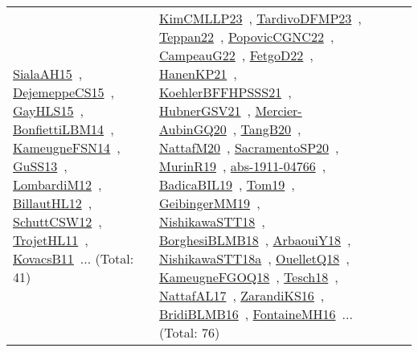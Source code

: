 {\begin{longtable}{lp{3cm}>{\raggedright\arraybackslash}p{6cm}>{\raggedright\arraybackslash}p{6cm}>{\raggedright\arraybackslash}p{8cm}}
\href{papers/SialaAH15.pdf}{SialaAH15}~\cite{SialaAH15}, \href{papers/DejemeppeCS15.pdf}{DejemeppeCS15}~\cite{DejemeppeCS15}, \href{papers/GayHLS15.pdf}{GayHLS15}~\cite{GayHLS15}, \href{articles/BonfiettiLBM14.pdf}{BonfiettiLBM14}~\cite{BonfiettiLBM14}, \href{articles/KameugneFSN14.pdf}{KameugneFSN14}~\cite{KameugneFSN14}, \href{papers/GuSS13.pdf}{GuSS13}~\cite{GuSS13}, \href{articles/LombardiM12.pdf}{LombardiM12}~\cite{LombardiM12}, \href{papers/BillautHL12.pdf}{BillautHL12}~\cite{BillautHL12}, \href{papers/SchuttCSW12.pdf}{SchuttCSW12}~\cite{SchuttCSW12}, \href{articles/TrojetHL11.pdf}{TrojetHL11}~\cite{TrojetHL11}, \href{articles/KovacsB11.pdf}{KovacsB11}~\cite{KovacsB11}... (Total: 41) & \href{papers/KimCMLLP23.pdf}{KimCMLLP23}~\cite{KimCMLLP23}, \href{papers/TardivoDFMP23.pdf}{TardivoDFMP23}~\cite{TardivoDFMP23}, \href{papers/Teppan22.pdf}{Teppan22}~\cite{Teppan22}, \href{papers/PopovicCGNC22.pdf}{PopovicCGNC22}~\cite{PopovicCGNC22}, \href{articles/CampeauG22.pdf}{CampeauG22}~\cite{CampeauG22}, \href{articles/FetgoD22.pdf}{FetgoD22}~\cite{FetgoD22}, \href{papers/HanenKP21.pdf}{HanenKP21}~\cite{HanenKP21}, \href{articles/KoehlerBFFHPSSS21.pdf}{KoehlerBFFHPSSS21}~\cite{KoehlerBFFHPSSS21}, \href{articles/HubnerGSV21.pdf}{HubnerGSV21}~\cite{HubnerGSV21}, \href{papers/Mercier-AubinGQ20.pdf}{Mercier-AubinGQ20}~\cite{Mercier-AubinGQ20}, \href{papers/TangB20.pdf}{TangB20}~\cite{TangB20}, \href{papers/NattafM20.pdf}{NattafM20}~\cite{NattafM20}, \href{articles/SacramentoSP20.pdf}{SacramentoSP20}~\cite{SacramentoSP20}, \href{papers/MurinR19.pdf}{MurinR19}~\cite{MurinR19}, \href{articles/abs-1911-04766.pdf}{abs-1911-04766}~\cite{abs-1911-04766}, \href{papers/BadicaBIL19.pdf}{BadicaBIL19}~\cite{BadicaBIL19}, \href{papers/Tom19.pdf}{Tom19}~\cite{Tom19}, \href{papers/GeibingerMM19.pdf}{GeibingerMM19}~\cite{GeibingerMM19}, \href{papers/NishikawaSTT18.pdf}{NishikawaSTT18}~\cite{NishikawaSTT18}, \href{articles/BorghesiBLMB18.pdf}{BorghesiBLMB18}~\cite{BorghesiBLMB18}, \href{papers/ArbaouiY18.pdf}{ArbaouiY18}~\cite{ArbaouiY18}, \href{papers/NishikawaSTT18a.pdf}{NishikawaSTT18a}~\cite{NishikawaSTT18a}, \href{papers/OuelletQ18.pdf}{OuelletQ18}~\cite{OuelletQ18}, \href{papers/KameugneFGOQ18.pdf}{KameugneFGOQ18}~\cite{KameugneFGOQ18}, \href{papers/Tesch18.pdf}{Tesch18}~\cite{Tesch18}, \href{articles/NattafAL17.pdf}{NattafAL17}~\cite{NattafAL17}, \href{articles/ZarandiKS16.pdf}{ZarandiKS16}~\cite{ZarandiKS16}, \href{articles/BridiBLMB16.pdf}{BridiBLMB16}~\cite{BridiBLMB16}, \href{papers/FontaineMH16.pdf}{FontaineMH16}~\cite{FontaineMH16}... (Total: 76)\\

\end{longtable}}
